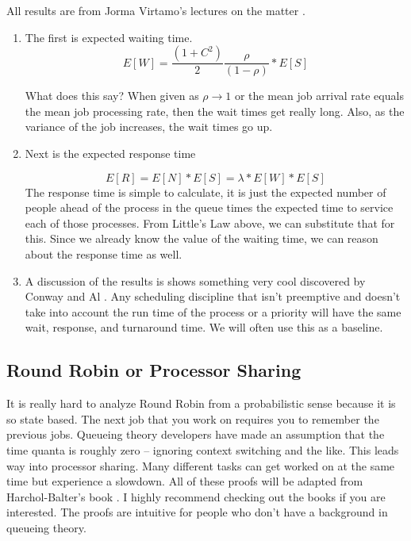 All results are from Jorma Virtamo's lectures on the matter \cite{virtamo}.

\begin{enumerate}
\item The first is expected waiting time.
  \[
  E[W] = \frac{(1 + C^2)}{2}\frac{\rho}{(1 - \rho)} * E[S]
  \]

  What does this say? When given as $\rho \rightarrow 1$ or the mean job arrival rate equals the mean job processing rate, then the wait times get really long.
  Also, as the variance of the job increases, the wait times go up.

\item Next is the expected response time

  \[
  E[R] = E[N] * E[S] = \lambda * E[W] * E[S]
  \]
  The response time is simple to calculate, it is just the expected number of people ahead of the process in the queue times the expected time to service each of those processes.
  From Little's Law above, we can substitute that for this. Since we already know the value of the waiting time, we can reason about the response time as well.
\item A discussion of the results is shows something very cool discovered by Conway and Al \cite{conway1967theory}.
  Any scheduling discipline that isn't preemptive and doesn't take into account the run time of the process or a priority will have the same wait, response, and turnaround time.
  We will often use this as a baseline.
\end{enumerate}

\subsection{Round Robin or Processor Sharing}

It is really hard to analyze Round Robin from a probabilistic sense because it is so state based.
The next job that you work on requires you to remember the previous jobs.
Queueing theory developers have made an assumption that the time quanta is roughly zero -- ignoring context switching and the like.
This leads way into processor sharing.
Many different tasks can get worked on at the same time but experience a slowdown.
All of these proofs will be adapted from Harchol-Balter's book \cite{harchol2013performance}.
I highly recommend checking out the books if you are interested.
The proofs are intuitive for people who don't have a background in queueing theory.


